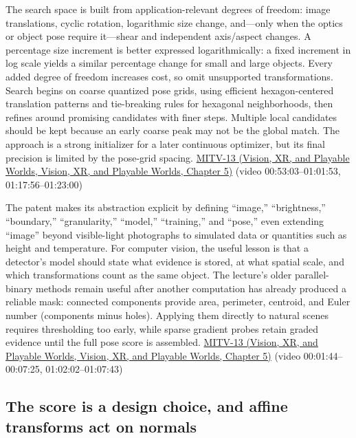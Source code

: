 The search space is built from application-relevant degrees of freedom: image translations, cyclic rotation, logarithmic size change, and---only when the optics or object pose require it---shear and independent axis/aspect changes. A percentage size increment is better expressed logarithmically: a fixed increment in log scale yields a similar percentage change for small and large objects. Every added degree of freedom increases cost, so omit unsupported transformations. Search begins on coarse quantized pose grids, using efficient hexagon-centered translation patterns and tie-breaking rules for hexagonal neighborhoods, then refines around promising candidates with finer steps. Multiple local candidates should be kept because an early coarse peak may not be the global match. The approach is a strong initializer for a later continuous optimizer, but its final precision is limited by the pose-grid spacing. \href{../07-Vision-XR-and-Playable-Worlds/main.pdf\#nameddest=04-visual-computing-ii-ch036-mitv-13---object-detection-recognition-and-pose-determination-patquick-us-7016539}{MITV-13 (Vision, XR, and Playable Worlds, Vision, XR, and Playable Worlds, Chapter 5)} (video 00:53:03--01:01:53, 01:17:56--01:23:00)

The patent makes its abstraction explicit by defining ``image,'' ``brightness,'' ``boundary,'' ``granularity,'' ``model,'' ``training,'' and ``pose,'' even extending ``image'' beyond visible-light photographs to simulated data or quantities such as height and temperature. For computer vision, the useful lesson is that a detector's model should state what evidence is stored, at what spatial scale, and which transformations count as the same object. The lecture's older parallel-binary methods remain useful after another computation has already produced a reliable mask: connected components provide area, perimeter, centroid, and Euler number (components minus holes). Applying them directly to natural scenes requires thresholding too early, while sparse gradient probes retain graded evidence until the full pose score is assembled. \href{../07-Vision-XR-and-Playable-Worlds/main.pdf\#nameddest=04-visual-computing-ii-ch036-mitv-13---object-detection-recognition-and-pose-determination-patquick-us-7016539}{MITV-13 (Vision, XR, and Playable Worlds, Vision, XR, and Playable Worlds, Chapter 5)} (video 00:01:44--00:07:25, 01:02:02--01:07:43)

\subsection{The score is a design choice, and affine transforms act on normals}\label{04-visual-computing-ii-ch030-the-score-is-a-design-choice-and-affine-transforms-act-on-normals}

